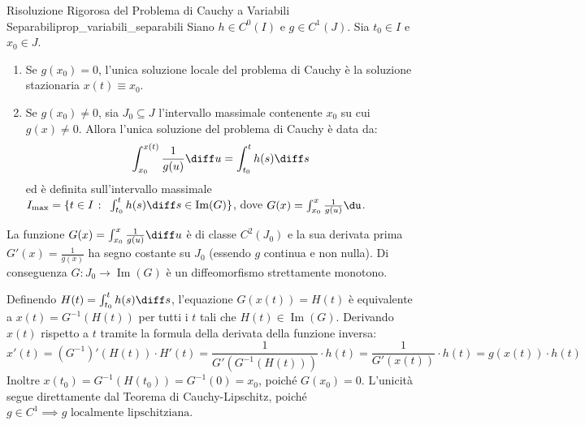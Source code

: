\begin{teorema}{Risoluzione Rigorosa del Problema di Cauchy a Variabili Separabili}{prop_variabili_separabili}
Siano $h \in C^0(I)$ e $g \in C^1(J)$. Sia $t_0 \in I$ e $x_0 \in J$.
\begin{enumerate}
    \item Se $g(x_0) = 0$, l'unica soluzione locale del problema di Cauchy è la soluzione stazionaria $x(t) \equiv x_0$.
    \item Se $g(x_0) \neq 0$, sia $J_0 \subseteq J$ l'intervallo massimale contenente $x_0$ su cui $g(x) \neq 0$. Allora l'unica soluzione del problema di Cauchy è data da:
    \begin{equation}
        \label{eq:cauchy_separabili_integrale}
        \int_{x_0}^{x(t)} \frac{1}{g(u)} \diff u = \int_{t_0}^t h(s) \diff s
    \end{equation}
    ed è definita sull'intervallo massimale $I_{\text{max}} = \{ t \in I \;\colon\; \int_{t_0}^t h(s)\diff s \in \operatorname{Im}(G) \}$, dove $G(x) = \int_{x_0}^x \frac{1}{g(u)}\du$.
\end{enumerate}
\end{teorema}

\begin{dimostrazione}
La funzione $G(x) = \int_{x_0}^x \frac{1}{g(u)} \diff u$ è di classe $C^2(J_0)$ e la sua derivata prima $G'(x) = \frac{1}{g(x)}$ ha segno costante su $J_0$ (essendo $g$ continua e non nulla). Di conseguenza $G \colon J_0 \to \operatorname{Im}(G)$ è un diffeomorfismo strettamente monotono.

Definendo $H(t) = \int_{t_0}^t h(s) \diff s$, l'equazione $G(x(t)) = H(t)$ è equivalente a $x(t) = G^{-1}(H(t))$ per tutti i $t$ tali che $H(t) \in \operatorname{Im}(G)$.
Derivando $x(t)$ rispetto a $t$ tramite la formula della derivata della funzione inversa:
\[
    x'(t) = (G^{-1})'(H(t)) \cdot H'(t) = \frac{1}{G'(G^{-1}(H(t)))} \cdot h(t) = \frac{1}{G'(x(t))} \cdot h(t) = g(x(t)) \cdot h(t)
\]
Inoltre $x(t_0) = G^{-1}(H(t_0)) = G^{-1}(0) = x_0$, poiché $G(x_0) = 0$. L'unicità segue direttamente dal Teorema di Cauchy-Lipschitz, poiché $g \in C^1 \implies g \text{ localmente lipschitziana}$.
\end{dimostrazione}

\newpage

